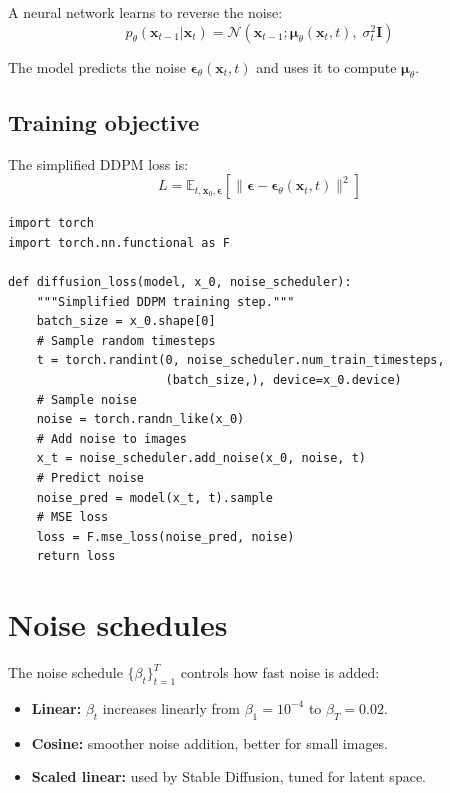 A neural network learns to reverse the noise:
\[
p_\theta(\mathbf{x}_{t-1} | \mathbf{x}_t) = \mathcal{N}(\mathbf{x}_{t-1}; \boldsymbol{\mu}_\theta(\mathbf{x}_t, t),\; \sigma_t^2 \mathbf{I})
\]

The model predicts the noise $\boldsymbol{\epsilon}_\theta(\mathbf{x}_t, t)$ and uses it to compute $\boldsymbol{\mu}_\theta$.

\subsection{Training objective}

The simplified DDPM loss is:
\[
L = \mathbb{E}_{t, \mathbf{x}_0, \boldsymbol{\epsilon}} \left[\| \boldsymbol{\epsilon} - \boldsymbol{\epsilon}_\theta(\mathbf{x}_t, t) \|^2 \right]
\]

\begin{verbatim}
import torch
import torch.nn.functional as F

def diffusion_loss(model, x_0, noise_scheduler):
    """Simplified DDPM training step."""
    batch_size = x_0.shape[0]
    # Sample random timesteps
    t = torch.randint(0, noise_scheduler.num_train_timesteps,
                      (batch_size,), device=x_0.device)
    # Sample noise
    noise = torch.randn_like(x_0)
    # Add noise to images
    x_t = noise_scheduler.add_noise(x_0, noise, t)
    # Predict noise
    noise_pred = model(x_t, t).sample
    # MSE loss
    loss = F.mse_loss(noise_pred, noise)
    return loss
\end{verbatim}

\section{Noise schedules}

The noise schedule $\{\beta_t\}_{t=1}^T$ controls how fast noise is added:

\begin{itemize}
  \item \textbf{Linear:} $\beta_t$ increases linearly from $\beta_1 = 10^{-4}$ to $\beta_T = 0.02$.
  \item \textbf{Cosine:} smoother noise addition, better for small images.
  \item \textbf{Scaled linear:} used by Stable Diffusion, tuned for latent space.
\end{itemize}

